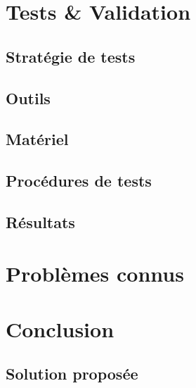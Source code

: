 \documentclass[11pt,a4paper,oldfontcommands]{memoir}
\begin{document}

\chapter{Tests \& Validation}

\section{Stratégie de tests}

\section{Outils}

\section{Matériel}

\section{Procédures de tests}

\section{Résultats}


\chapter{Problèmes connus}


\chapter{Conclusion}

\section{Solution proposée}
\end{document}
